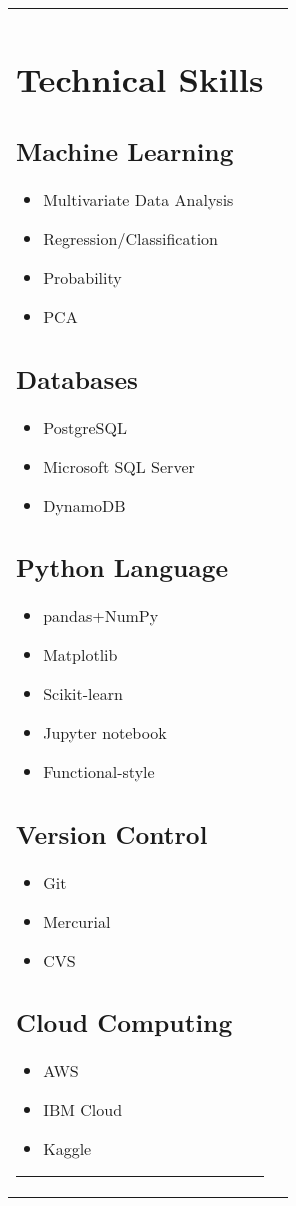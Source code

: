 \documentclass{article}
\begin{document}
\begin{tabular*}{7.5in}{ l | l}
	\begin{minipage}[t]{2.0in}
	\section*{Technical Skills}
	\subsection*{Machine Learning}
	\begin{itemize}[noitemsep]
		\item Multivariate Data Analysis
		\item Regression/Classification
		\item Probability
		\item PCA
	\end{itemize}
		\subsection*{Databases}
	\begin{itemize}[noitemsep]
		\item PostgreSQL
		\item Microsoft SQL Server
		\item DynamoDB
	\end{itemize}
	\subsection*{Python Language}	
	\begin{itemize}[noitemsep]
		\item pandas+NumPy
		\item Matplotlib
		\item Scikit-learn
		\item Jupyter notebook
		\item Functional-style
	\end{itemize}
	\subsection*{Version Control}
	\begin{itemize}[noitemsep]
		\item Git
		\item Mercurial
		\item CVS
	\end{itemize}
	\subsection*{Cloud Computing}
	\begin{itemize}[noitemsep]
		\item AWS
		\item IBM Cloud
		\item Kaggle
	\end{itemize}
	\hrule

\end{minipage}
\end{tabular*}
\end{document}
